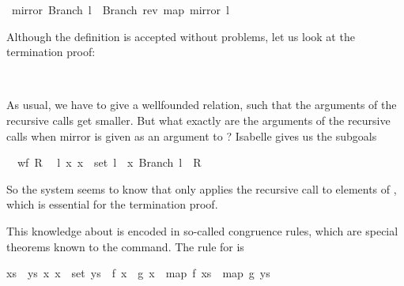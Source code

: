 \begin{isabellebody}
{}\ {}mirror\ {}Branch\ l{}\ {}\ Branch\ {}rev\ {}map\ mirror\ l{}{}{}%
\begin{isamarkuptext}%
Although the definition is accepted without problems, let us look at the termination proof:%
\end{isamarkuptext}%
\isamarkuptrue%
\isamarkupfalse%
%
\isadelimproof
\ %
\endisadelimproof
%
\isatagproof
{}\isamarkupfalse%
%
\begin{isamarkuptxt}%
As usual, we have to give a wellfounded relation, such that the
  arguments of the recursive calls get smaller. But what exactly are
  the arguments of the recursive calls when mirror is given as an
  argument to ? Isabelle gives us the
  subgoals

  \begin{isabelle}%
\ {}{}\ wf\ {}R\isanewline
\ {}{}\ {}l\ x{}\ x\ {}\ set\ l\ {}\ {}x{}\ Branch\ l{}\ {}\ {}R%
\end{isabelle} 

  So the system seems to know that  only
  applies the recursive call  to elements
  of , which is essential for the termination proof.

  This knowledge about  is encoded in so-called congruence rules,
  which are special theorems known to the  command. The
  rule for  is

  \begin{isabelle}%
{}{}xs\ {}\ {}ys{}\ {}x{}\ x\ {}\ set\ {}ys\ {}\ {}f\ x\ {}\ {}g\ x{}\ {}\ map\ {}f\ {}xs\ {}\ map\ {}g\ {}ys%
\end{isabelle}


\end{isamarkuptxt}
\end{isabellebody}
